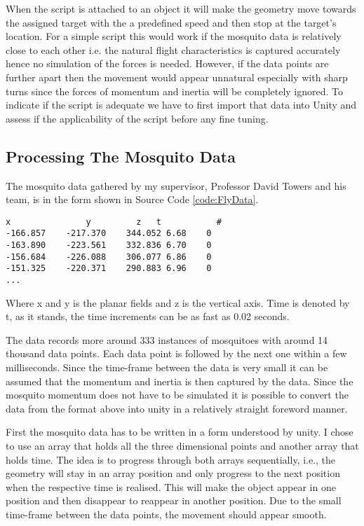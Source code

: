 When the script is attached to an object it will make the geometry move towards the assigned target with the a predefined speed and then stop at the target's location. For a simple script this would work if the mosquito data is relatively close to each other i.e. the natural flight characteristics is captured accurately hence no simulation of the forces is needed. However, if the data points are further apart then the movement would appear unnatural especially with sharp turns since the forces of momentum and inertia will be completely ignored. To indicate if the script is adequate we have to first import that data into Unity and assess if the applicability of the script before any fine tuning.



\subsection{Processing The Mosquito Data}
The mosquito data gathered by my supervisor, Professor David Towers and his team, is in the form shown in Source Code \ref{code:FlyData}.

\bigskip
\begin{code1}
\begin{verbatim}
x	            y	      z	  t           #
-166.857	-217.370	344.052	6.68	0
-163.890	-223.561	332.836	6.70	0
-156.684	-226.088	306.077	6.86	0
-151.325	-220.371	290.883	6.96	0
...
\end{verbatim}
\label{code:FlyData}
\end{code1}

Where x and y is the planar fields and z is the vertical axis. Time is denoted by t, as it stands, the time increments can be as fast as 0.02 seconds.

The data records more around 333 instances of mosquitoes with around 14 thousand data points. Each data point is followed by the next one within a few milliseconds. Since the time-frame between the data is very small it can be assumed that the momentum and inertia is then captured by the data. Since the mosquito momentum does not have to be simulated it is possible to convert the data from the format above into unity in a relatively straight foreword manner.

First the mosquito data has to be written in a form understood by unity. I chose to use an array that holds all the three dimensional points and another array that holds time. The idea is to progress through both arrays sequentially, i.e., the geometry will stay in an array position and only progress to the next position when the respective time is realised. This will make the object appear in one position and then disappear to reappear in another position. Due to the small time-frame between the data points, the movement should appear smooth. 

